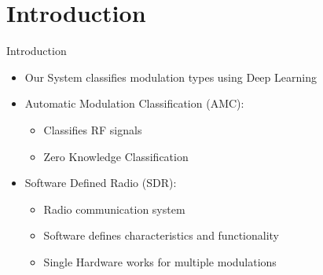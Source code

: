 
\section{Introduction}
\begin{frame}{Introduction}
    \begin{itemize}
        \item Our System classifies modulation types using Deep Learning \\[1.5em]
        \item Automatic Modulation Classification (AMC):
        \begin{itemize}
            \item Classifies RF signals
            \item Zero Knowledge Classification \\[1.5em]
        \end{itemize}
        \item Software Defined Radio (SDR):
        \begin{itemize}
            \item Radio communication system
            \item Software defines characteristics and functionality
            \item Single Hardware works for multiple modulations
        \end{itemize}
    \end{itemize}
\end{frame}
